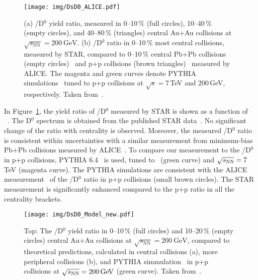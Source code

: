 \begin{figure}[!htb]
\begin{center}
  \texttt{[image: img/DsD0\_ALICE.pdf]}\\
\end{center} 
\caption[The ratio between \Ds\ and D$^0$ yield in
Au+Au collisions, compared to p+p and Pb+Pb collisions.]{\label{Ds}(a) \Ds/D$^0$ yield ratio, measured in 0--10$\,\%$ (full circles), 10--40$\,\%$ (empty circles), and 40--80$\,\%$ (triangles) central Au+Au
collisions at $\sqrt{s_\mathrm{NN}} = \SI{200}{\giga\electronvolt}$\@. (b) \Ds/D$^0$ ratio in 0--10$\,\%$ most central collisions, measured by STAR, compared to 0--10$\,\%$ central Pb+Pb collisions (empty circles)~\cite{AliceDs2018} and p+p collisions (brown triangles)~\cite{AliceDsPP} measured by ALICE. The magenta and green curves denote PYTHIA simulations~\cite{PYTHIA} tuned to p+p collisions at $\sqrt{s} = 7\,$TeV and 200$\,$GeV, respectively\@. Taken from~\cite{DsPaper}\@.}
\end{figure}

In Figure~\ref{Ds}, the yield ratio of
\Ds/D$^0$ measured by STAR is shown as a function of \pt~\cite{DsPaper}\@. The D$^0$ spectrum is obtained from the published STAR 
data~\cite{D0paper}\nocite{DavidThesis}\@. No significant change of the ratio with centrality is observed. Moreover, the measured \Ds/D$^0$
ratio is consistent within uncertainties with a similar measurement from minimum-bias Pb+Pb collisions  measured by ALICE~\cite{AliceDs2018}\@. 
To compare our measurement to the \Ds/D$^0$ in p+p collisions, 
PYTHIA 6.4~\cite{PYTHIA} is used, tuned to \snnFull\ (green curve) and $\sqrt{s_\text{NN}} = 7\,$TeV (magenta curve)\@. The PYTHIA simulations are consistent with the ALICE measurement~\cite{AliceDsPP} of the \Ds/D$^0$ ratio in p+p collisions (small brown circles)\@. The STAR measurement is significantly
enhanced compared to the p+p ratio in all the centrality brackets. 

\begin{figure}[!htb]
\begin{center}
  \texttt{[image: img/DsD0\_Model\_new.pdf]}\\
\end{center} 
\caption[The \Ds/D$^0$ yield ratio in
Au+Au collisions, compared to theoretical calculations.]{\label{DsModels}Top: The \Ds/D$^0$ yield ratio in
0--10$\,\%$ (full circles) and 10--20$\,\%$ (empty circles) central Au+Au collisions at $\sqrt{s_\mathrm{NN}} = \SI{200}{\giga\electronvolt}$, compared to theoretical predictions, calculated in central collisions (a), more peripheral collisions (b), and PYTHIA simmulation~\cite{PYTHIA} in p+p collisions at $\sqrt{s_\text{NN}} = \SI{200}{\giga\electronvolt}$ (green curve)\@. Taken from~\cite{DsPaper}\@.}
\end{figure}

